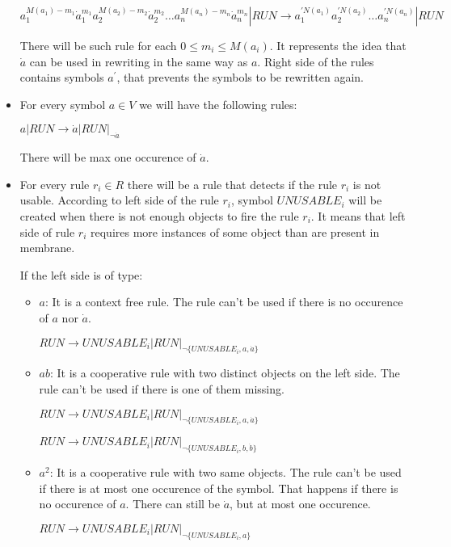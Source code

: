 \begin{dokaz}
\begin{itemize}
    $a_1^{M(a_1)-m_1}\dot{a}_1^{m_1}a_2^{M(a_2)-m_2}\dot{a}_2^{m_2}\dots a_n^{M(a_n)-m_n}\dot{a}_n^{m_n}|RUN \rightarrow a_1^{\prime N(a_1)}a_2^{\prime N(a_2)}\dots a_n^{\prime N(a_n)}|RUN$

    There will be such rule for each $0\leq m_i\leq M(a_i)$. It represents the idea that $\dot{a}$ can be used in rewriting in the same way as $a$. Right side of the rules contains symbols $a^\prime$, that prevents the symbols to be rewritten again.

    \item For every symbol $a\in V$ we will have the following rules:

    $a|RUN \rightarrow \dot{a}|RUN|_{\neg \dot{a}}$

    There will be max one occurence of $\dot{a}$.

    \item For every rule $r_i\in R$ there will be a rule that detects if the rule $r_i$ is not usable. According to left side of the rule $r_i$, symbol $UNUSABLE_i$ will be created when there is not enough objects to fire the rule $r_i$. It means that left side of rule $r_i$ requires more instances of some object than are present in membrane.

    If the left side is of type:
    \begin{itemize}
      \item $a$: It is a context free rule. The rule can't be used if there is no occurence of $a$ nor $\dot{a}$.

      $RUN \rightarrow UNUSABLE_i|RUN|_{\neg\{UNUSABLE_i, a, \dot{a}\}}$

      \item $ab$: It is a cooperative rule with two distinct objects on the left side. The rule can't be used if there is one of them missing.

      $RUN \rightarrow UNUSABLE_i|RUN|_{\neg\{UNUSABLE_i, a, \dot{a}\}}$

      $RUN \rightarrow UNUSABLE_i|RUN|_{\neg\{UNUSABLE_i, b, \dot{b}\}}$

      \item $a^2$: It is a cooperative rule with two same objects. The rule can't be used if there is at most one occurence of the symbol. That happens if there is no occurence of $a$. There can still be $\dot{a}$, but at most one occurence.

      $RUN \rightarrow UNUSABLE_i|RUN|_{\neg\{UNUSABLE_i, a\}}$
    \end{itemize}


\end{itemize}
\end{dokaz}
